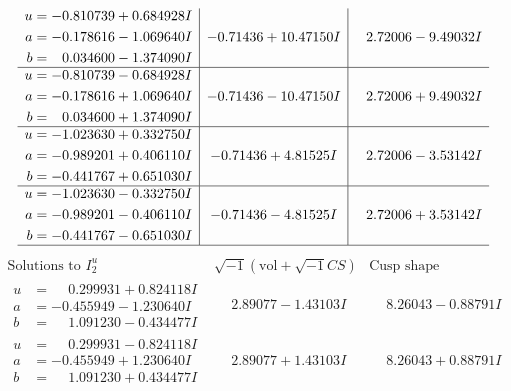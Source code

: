 \documentclass[1p]{elsarticle_modified}
\theoremstyle{definition}
\newcommand{\I}{\sqrt{-1}}
\begin{document}
$$\begin{array}{c|c|c}
\begin{aligned}
u &= -0.810739 + 0.684928 I \\
a &= -0.178616 - 1.069640 I \\
b &= \phantom{-}0.034600 - 1.374090 I\end{aligned}
 & -0.71436 + 10.47150 I & \phantom{-}2.72006 - 9.49032 I \\ \hline\begin{aligned}
u &= -0.810739 - 0.684928 I \\
a &= -0.178616 + 1.069640 I \\
b &= \phantom{-}0.034600 + 1.374090 I\end{aligned}
 & -0.71436 - 10.47150 I & \phantom{-}2.72006 + 9.49032 I \\ \hline\begin{aligned}
u &= -1.023630 + 0.332750 I \\
a &= -0.989201 + 0.406110 I \\
b &= -0.441767 + 0.651030 I\end{aligned}
 & -0.71436 + 4.81525 I & \phantom{-}2.72006 - 3.53142 I \\ \hline\begin{aligned}
u &= -1.023630 - 0.332750 I \\
a &= -0.989201 - 0.406110 I \\
b &= -0.441767 - 0.651030 I\end{aligned}
 & -0.71436 - 4.81525 I & \phantom{-}2.72006 + 3.53142 I\\
 \hline 
 \end{array}$$\newpage$$\begin{array}{c|c|c}  
\text{Solutions to }I^u_{2}& \I (\text{vol} + \sqrt{-1}CS) & \text{Cusp shape}\\
 \hline 
\begin{aligned}
u &= \phantom{-}0.299931 + 0.824118 I \\
a &= -0.455949 - 1.230640 I \\
b &= \phantom{-}1.091230 - 0.434477 I\end{aligned}
 & \phantom{-}2.89077 - 1.43103 I & \phantom{-}8.26043 - 0.88791 I \\ \hline\begin{aligned}
u &= \phantom{-}0.299931 - 0.824118 I \\
a &= -0.455949 + 1.230640 I \\
b &= \phantom{-}1.091230 + 0.434477 I\end{aligned}
 & \phantom{-}2.89077 + 1.43103 I & \phantom{-}8.26043 + 0.88791 I \\ \hline\begin{aligned}

\end{aligned}
\end{array}$$
\end{document}
